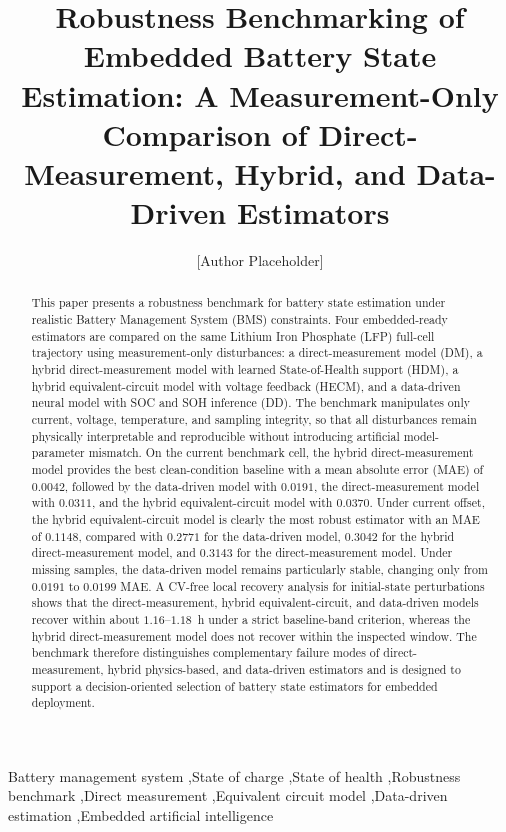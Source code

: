 \documentclass[review,nopreprintline]{elsarticle}
\date{}
\begin{document}
\linenumbers
\begin{frontmatter}
\title{Robustness Benchmarking of Embedded Battery State Estimation: A Measurement-Only Comparison of Direct-Measurement, Hybrid, and Data-Driven Estimators}
\author[1]{[Author Placeholder]}
\begin{abstract}
This paper presents a robustness benchmark for battery state estimation under realistic Battery Management System (BMS) constraints. Four embedded-ready estimators are compared on the same Lithium Iron Phosphate (LFP) full-cell trajectory using measurement-only disturbances: a direct-measurement model (DM), a hybrid direct-measurement model with learned State-of-Health support (HDM), a hybrid equivalent-circuit model with voltage feedback (HECM), and a data-driven neural model with SOC and SOH inference (DD). The benchmark manipulates only current, voltage, temperature, and sampling integrity, so that all disturbances remain physically interpretable and reproducible without introducing artificial model-parameter mismatch. On the current benchmark cell, the hybrid direct-measurement model provides the best clean-condition baseline with a mean absolute error (MAE) of $0.0042$, followed by the data-driven model with $0.0191$, the direct-measurement model with $0.0311$, and the hybrid equivalent-circuit model with $0.0370$. Under current offset, the hybrid equivalent-circuit model is clearly the most robust estimator with an MAE of $0.1148$, compared with $0.2771$ for the data-driven model, $0.3042$ for the hybrid direct-measurement model, and $0.3143$ for the direct-measurement model. Under missing samples, the data-driven model remains particularly stable, changing only from $0.0191$ to $0.0199$ MAE. A CV-free local recovery analysis for initial-state perturbations shows that the direct-measurement, hybrid equivalent-circuit, and data-driven models recover within about $1.16$--$1.18$~h under a strict baseline-band criterion, whereas the hybrid direct-measurement model does not recover within the inspected window. The benchmark therefore distinguishes complementary failure modes of direct-measurement, hybrid physics-based, and data-driven estimators and is designed to support a decision-oriented selection of battery state estimators for embedded deployment.
\end{abstract}
\begin{keyword}
Battery management system \sep State of charge \sep State of health \sep Robustness benchmark \sep Direct measurement \sep Equivalent circuit model \sep Data-driven estimation \sep Embedded artificial intelligence
\end{keyword}
\end{frontmatter}
\end{document}
